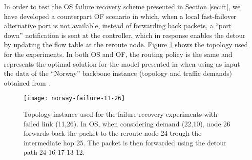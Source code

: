 \documentclass[10pt,conference]{IEEEtran}
\begin{document}
In order to test the OS failure recovery scheme presented in Section \ref{sec:ft}, we have developed a counterpart OF scenario in which, when a local fast-failover alternative port is not available, instead of forwarding back packets, a ``port down'' notification is sent at the controller, which in response enables the detour by updating the flow table at the reroute node. Figure \ref{fig:failure-13-12} shows the topology used for the experiments. In both OS and OF, the routing policy is the same and represents the optimal solution for the model presented in \cite{Cap15} when using as input the data of the ``Norway'' backbone instance (topology and traffic demands) obtained from \cite{SND}.

\begin{figure}
  \centering
  \texttt{[image: norway-failure-11-26]}
  \caption{Topology instance used for the failure recovery experiments with failed link (11,26). In OS, when considering demand (22,10), node 26 forwards back the packet to the reroute node 24 trough the intermediate hop 25. The packet is then forwarded using the detour path 24-16-17-13-12.}
  \label{fig:failure-13-12}
\end{figure}
\end{document}
